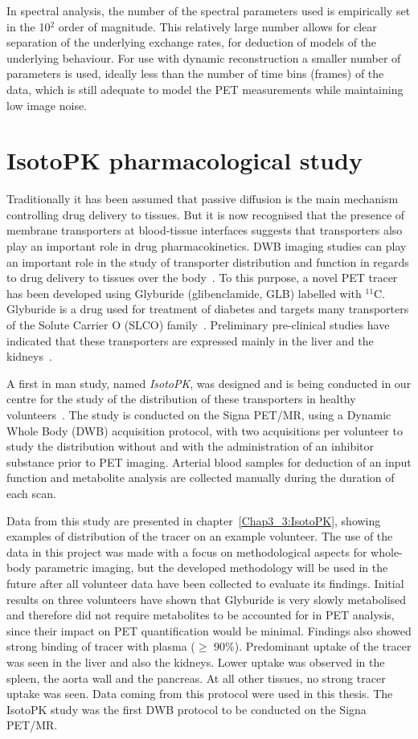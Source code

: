 In spectral analysis, the number of the spectral parameters used is empirically set in the 10$^2$ order of magnitude. This relatively large number allows for clear separation of the underlying exchange rates, for deduction of models of the underlying behaviour. 
For use with dynamic reconstruction a smaller number of parameters is used, ideally less than the number of time bins (frames) of the data, which is still adequate to model the PET measurements while maintaining low image noise.
%
\section{IsotoPK pharmacological study}
Traditionally it has been assumed that passive diffusion is the main mechanism controlling drug delivery to tissues. 
But it is now recognised that the presence of membrane transporters at blood-tissue interfaces suggests that transporters also play an important role in drug pharmacokinetics. DWB imaging studies can play an important role in the study of transporter distribution and function in regards to drug delivery to tissues over the body~\cite{Marie2017}. 
To this purpose, a novel PET tracer has been developed using Glyburide (glibenclamide, GLB) labelled with $^{11}$C. Glyburide is a drug used for treatment of diabetes and targets many transporters of the Solute Carrier O (SLCO) family~\cite{Tournier2013,Caille2020}. Preliminary pre-clinical studies have indicated that these transporters are expressed mainly in the liver and the kidneys~\cite{Tournier2013}.

A first in man study, named \textit{IsotoPK}, was designed and is being conducted in our centre for the study of the distribution of these transporters in healthy volunteers~\cite{Marie2019}.
The study is conducted on the Signa PET/MR, using a Dynamic Whole Body (DWB) acquisition protocol, with two acquisitions per volunteer to study the distribution without and with the administration of an inhibitor substance prior to PET imaging.
Arterial blood samples for deduction of an input function and metabolite analysis are collected manually during the duration of each scan. 

Data from this study are presented in chapter~\ref{Chap3_3:IsotoPK}, showing examples of distribution of the tracer on an example volunteer. The use of the data in this project was made with a focus on methodological aspects for whole-body parametric imaging, but the developed methodology will be used in the future after all volunteer data have been collected to evaluate its findings.
Initial results on three volunteers have shown that Glyburide is very slowly metabolised and therefore did not require metabolites to be accounted for in PET analysis, since their impact on PET quantification would be minimal. Findings also showed strong binding of tracer with plasma ($\geq$ 90\%).
Predominant uptake of the tracer was seen in the liver and also the kidneys. Lower uptake was observed in the spleen, the aorta wall and the pancreas. At all other tissues, no strong tracer uptake was seen.
%
Data coming from this protocol were used in this thesis. The IsotoPK study was the first DWB protocol to be conducted on the Signa PET/MR. 

